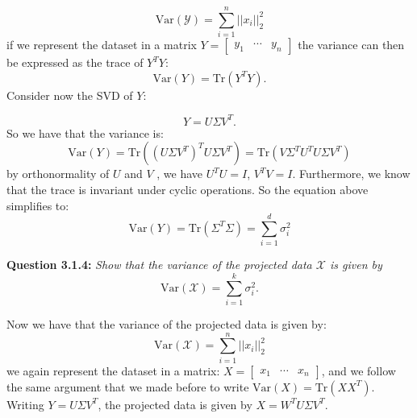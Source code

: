 \documentclass{article}
\begin{document}
\begin{multicols}{2}
    \begin{equation*}
        \text{Var}(\mathcal{Y})= \sum_{i=1}^{n}||x_i||_2^2
    \end{equation*}
    if we represent the dataset in a matrix $Y = \begin{bmatrix}
        y_1 & \cdots & y_n
    \end{bmatrix}$ the variance can then be expressed as the trace of $Y^TY$:
    \begin{equation*}
        \text{Var}(Y) =\text{Tr}(Y^TY).
    \end{equation*}
    Consider now the SVD of $Y$:

    \begin{equation*}
        Y = U \Sigma V^T.
    \end{equation*}
    So we have that the variance is:
    \begin{equation*}
        \text{Var}(Y) =\text{Tr}((U \Sigma V^T)^TU \Sigma V^T) = \text{Tr}(V \Sigma^T U^T U \Sigma V^T)
    \end{equation*}
    by orthonormality of $U$ and $V$ , we have $U^TU=I$, $V^TV=I$. Furthermore, we know that the trace is invariant under cyclic 
    operations. So the equation above simplifies to:
    \begin{equation*}
        \text{Var}(Y) = \text{Tr}(\Sigma^T \Sigma) = \sum_{i=1}^{d} \sigma_i^2
    \end{equation*} 
    \vspace{0.5cm}

    \noindent \textbf{Question 3.1.4:}  
    \textit{Show that the variance of the projected data \( \mathcal{X} \) is given by}  
    \[
    \text{Var}(\mathcal{X}) = \sum_{i=1}^k \sigma_i^2.
    \]

    \vspace{0.5cm}
    Now we have that the variance of the projected data is given by:
    \begin{equation*}
        \text{Var}(\mathcal{X}) = \sum_{i=1}^{n}||x_i||_2^2
    \end{equation*}    
    we again represent the dataset in a matrix:
    \(X = \begin{bmatrix}
         x_1 & \cdots & x_n 
        \end{bmatrix}\), and we follow the same argument that we made before to write  $\text{Var}(X)=\text{Tr}(XX^T)$.
    Writing $Y = U \Sigma V^T$, the projected data is given by $X = W^T U \Sigma V^T$.


\end{multicols}
\end{document}
